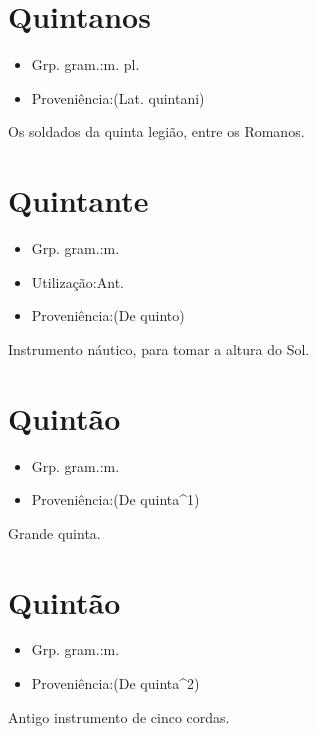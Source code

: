 \section{Quintanos}
\begin{itemize}
\item {Grp. gram.:m. pl.}
\end{itemize}
\begin{itemize}
\item {Proveniência:(Lat. \textunderscore quintani\textunderscore )}
\end{itemize}
Os soldados da quinta legião, entre os Romanos.
\section{Quintante}
\begin{itemize}
\item {Grp. gram.:m.}
\end{itemize}
\begin{itemize}
\item {Utilização:Ant.}
\end{itemize}
\begin{itemize}
\item {Proveniência:(De \textunderscore quinto\textunderscore )}
\end{itemize}
Instrumento náutico, para tomar a altura do Sol.
\section{Quintão}
\begin{itemize}
\item {Grp. gram.:m.}
\end{itemize}
\begin{itemize}
\item {Proveniência:(De \textunderscore quinta\textunderscore ^1)}
\end{itemize}
Grande quinta.
\section{Quintão}
\begin{itemize}
\item {Grp. gram.:m.}
\end{itemize}
\begin{itemize}
\item {Proveniência:(De \textunderscore quinta\textunderscore ^2)}
\end{itemize}
Antigo instrumento de cinco cordas.
